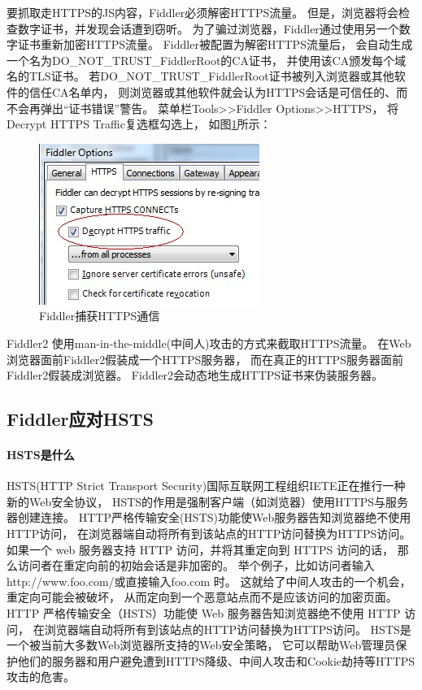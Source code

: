 \documentclass{book}
\begin{document}
要抓取走HTTPS的JS内容，Fiddler必须解密HTTPS流量。
但是，浏览器将会检查数字证书，并发现会话遭到窃听。
为了骗过浏览器，Fiddler通过使用另一个数字证书重新加密HTTPS流量。
Fiddler被配置为解密HTTPS流量后，
会自动生成一个名为DO\_NOT\_TRUST\_FiddlerRoot的CA证书，
并使用该CA颁发每个域名的TLS证书。
若DO\_NOT\_TRUST\_FiddlerRoot证书被列入浏览器或其他软件的信任CA名单内，
则浏览器或其他软件就会认为HTTPS会话是可信任的、而不会再弹出“证书错误”警告。
菜单栏Tools>>Fiddler Options>>HTTPS，
将Decrypt HTTPS Traffic复选框勾选上，
如图\ref{fig:FiddlerDecryptHttpsTraffic}所示：

\begin{figure}[htbp]
	\centering
	\includegraphics[scale=0.5]{FiddlerDecryptHttpsTraffic.jpg}
	\caption{Fiddler捕获HTTPS通信}
	\label{fig:FiddlerDecryptHttpsTraffic}
\end{figure}

Fiddler2 使用man-in-the-middle(中间人)攻击的方式来截取HTTPS流量。
在Web浏览器面前Fiddler2假装成一个HTTPS服务器，
而在真正的HTTPS服务器面前Fiddler2假装成浏览器。
Fiddler2会动态地生成HTTPS证书来伪装服务器。

\subsection{Fiddler应对HSTS}

\paragraph{HSTS是什么}HSTS(HTTP Strict Transport Security)国际互联网工程组织IETE正在推行一种新的Web安全协议，
HSTS的作用是强制客户端（如浏览器）使用HTTPS与服务器创建连接。
HTTP严格传输安全(HSTS)功能使Web服务器告知浏览器绝不使用HTTP访问，
在浏览器端自动将所有到该站点的HTTP访问替换为HTTPS访问。
如果一个 web 服务器支持 HTTP 访问，并将其重定向到 HTTPS 访问的话，
那么访问者在重定向前的初始会话是非加密的。
举个例子，比如访问者输入http://www.foo.com/或直接输入foo.com 时。
这就给了中间人攻击的一个机会，重定向可能会被破坏，
从而定向到一个恶意站点而不是应该访问的加密页面。
HTTP 严格传输安全（HSTS）功能使 Web 服务器告知浏览器绝不使用 HTTP 访问，
在浏览器端自动将所有到该站点的HTTP访问替换为HTTPS访问。
HSTS是一个被当前大多数Web浏览器所支持的Web安全策略，
它可以帮助Web管理员保护他们的服务器和用户避免遭到HTTPS降级、中间人攻击和Cookie劫持等HTTPS攻击的危害。
\end{document}
